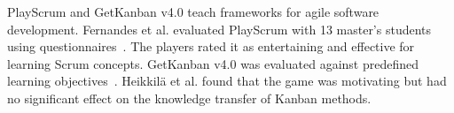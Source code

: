         PlayScrum and GetKanban v4.0 teach frameworks for agile software development. %
        Fernandes et al. evaluated PlayScrum with 13 master's students using questionnaires~\cite{fernandes_playscrum_2010}. 
        The players rated it as entertaining and effective for learning Scrum concepts. 
        GetKanban v4.0  was evaluated against predefined learning objectives~\cite{heikkila_teaching_2016}. %
        Heikkilä et al. found that the game was motivating but had no significant effect on the knowledge transfer of Kanban methods.
        
